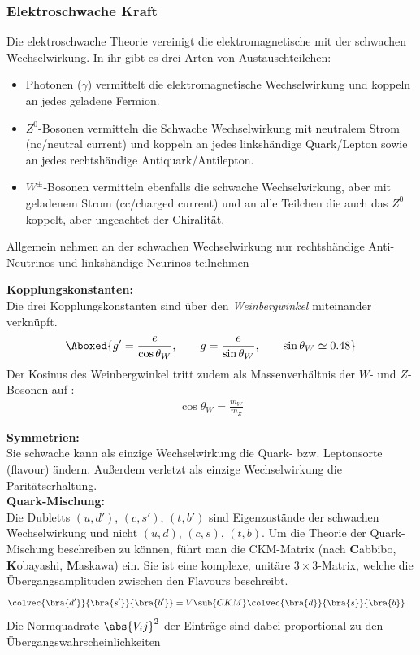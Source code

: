 \documentclass[final]{summery_5.0}
\begin{document}
\subsubsection{Elektroschwache Kraft}
Die elektroschwache Theorie vereinigt die elektromagnetische mit der schwachen
Wechselwirkung. In ihr gibt es drei Arten von Austauschteilchen:
\begin{itemize}
    \item Photonen ($\gamma$) vermittelt die elektromagnetische Wechselwirkung und koppeln an jedes geladene Fermion.
    \item $Z^0$-Bosonen vermitteln die Schwache Wechselwirkung mit neutralem Strom (nc/neutral current) und koppeln an jedes linkshändige Quark/Lepton sowie an jedes rechtshändige Antiquark/Antilepton.
    \item $W^\pm$-Bosonen vermitteln ebenfalls die schwache Wechselwirkung, aber mit geladenem Strom (cc/charged current) und an alle Teilchen die auch das $Z^0$ koppelt, aber ungeachtet der Chiralität.  
\end{itemize}
Allgemein nehmen an der schwachen Wechselwirkung nur rechtshändige
Anti-Neutrinos und linkshändige Neurinos teilnehmen

{\bf Kopplungskonstanten:}\\
Die drei Kopplungskonstanten sind über den \emph{Weinbergwinkel} miteinander verknüpft.
\begin{align*}
    \Aboxed{g' = \frac e{\cos\theta_W},\qquad g = \frac{e}{\sin\theta_W},\qquad \sin\theta_W \simeq 0.48}
\end{align*}
Der Kosinus des Weinbergwinkel tritt zudem als Massenverhältnis der $W$- und $Z$-Bosonen auf :
\begin{align*}
    \cos\theta_W = \frac{m_W}{m_Z}
\end{align*}

{\bf Symmetrien:}\\
Sie schwache kann als einzige Wechselwirkung die Quark- bzw. Leptonsorte (flavour) ändern. Außerdem  verletzt als einzige Wechselwirkung die Paritätserhaltung.\\

{\bf Quark-Mischung:}\\
Die Dubletts $(u,d')$, $(c,s')$, $(t,b')$ sind Eigenzustände der schwachen Wechselwirkung und nicht $(u,d)$, $(c,s)$, $(t,b)$.
Um die Theorie der Quark-Mischung beschreiben zu können, führt man die CKM-Matrix (nach {\bf C}abbibo, {\bf K}obayashi, {\bf M}askawa) ein. Sie ist eine komplexe, unitäre $3\times 3$-Matrix, welche die Übergangsamplituden zwischen den Flavours beschreibt.
\begin{align}
    \colvec{\bra{d'}}{\bra{s'}}{\bra{b'}} &= V\sub{CKM}\colvec{\bra{d}}{\bra{s}}{\bra{b}}
\end{align}
Die Normquadrate $\abs{V_ij}^2$ der Einträge sind dabei proportional zu den Übergangswahrscheinlichkeiten
\end{document}
